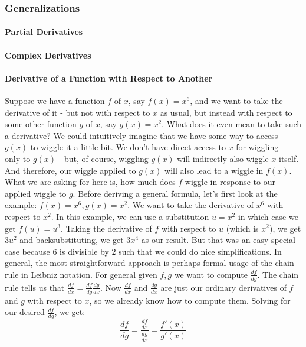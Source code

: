 


\subsubsection{Generalizations}

\paragraph{Partial Derivatives}

\paragraph{Complex Derivatives}

\paragraph{Derivative of a Function with Respect to Another}
Suppose we have a function $f$ of $x$, say $f(x) = x^6$, and we want to take the derivative of it - but not with respect to $x$ as usual, but instead with respect to some other function $g$ of $x$, say $g(x) = x^2$. What does it even mean to take such a derivative? We could intuitively imagine that we have some way to access $g(x)$ to wiggle it a little bit. We don't have direct access to $x$ for wiggling - only to $g(x)$ - but, of course, wiggling $g(x)$ will indirectly also wiggle $x$ itself. And therefore, our wiggle applied to $g(x)$ will also lead to a wiggle in $f(x)$. What we are asking for here is, how much does $f$ wiggle in response to our applied wiggle to $g$. Before deriving a general formula, let's first look at the example: $f(x) = x^6, g(x) = x^2$. We want to take the derivative of $x^6$ with respect to $x^2$. In this example, we can use a substitution $u = x^2$ in which case we get $f(u) = u^3$. Taking the derivative of $f$ with respect to $u$ (which is $x^2$), we get $3 u^2$ and backsubstituting, we get $3 x^4$ as our result. But that was an easy special case because $6$ is divisible by $2$ such that we could do nice simplifications. In general, the most straightforward approach is perhaps formal usage of the chain rule in Leibniz notation. For general given $f,g$ we want to compute $\frac{df}{dg}$. The chain rule tells us that $\frac{df}{dx} = \frac{df}{dg} \frac{dg}{dx}$. Now $\frac{df}{dx}$ and $\frac{dg}{dx}$ are just our ordinary derivatives of $f$ and $g$ with respect to $x$, so we already know how to compute them. Solving for our desired $\frac{df}{dg}$, we get:
\begin{equation}
\frac{df}{dg} = \frac{ \frac{df}{dx} }{ \frac{dg}{dx} }
              = \frac{ f'(x) }{ g'(x) }
\end{equation}

